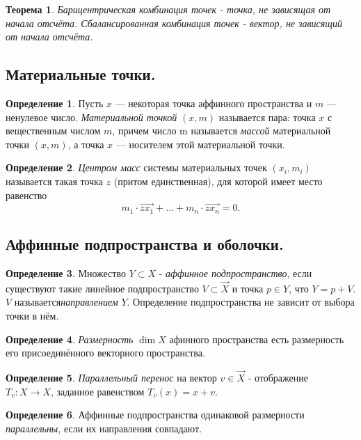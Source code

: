 \documentclass[a4paper,100pt]{article}
\theoremstyle{indented}
\newtheorem{theorem}{Теорема}
\theoremstyle{definition}
\newtheorem{defn}{Определение}
\theoremstyle{remark}
\DeclareMathOperator{\ra}{\rightarrow}
\begin{document}
\begin{theorem}
    Барицентрическая комбинация точек - точка, не зависящая от начала отсчёта. Сбалансированная комбинация точек - вектор, не зависящий от начала отсчёта.
\end{theorem}

\subsection{Материальные точки.}

\begin{defn}
    Пусть $x$ — некоторая точка аффинного пространства и $m$ — ненулевое число. \textit{Материальной точкой} $(x,m)$ называется пара: точка $x$ с вещественным числом $m$, причем число m называется \textit{массой} материальной точки $(x,m)$, а точка $x$ — носителем этой материальной точки.
\end{defn}

\begin{defn}
    \textit{Центром масс} системы материальных точек $(x_i, m_i)$ называется такая точка $z$ (притом единственная), для которой имеет место равенство
    \[
        m_1 \cdot \vec{zx_1} + \ldots + m_n \cdot \vec{zx_n} = 0. 
    \]
\end{defn}

\subsection{Аффинные подпространства и оболочки.}

\begin{defn}
    Множество $Y\subset X$ - \textit{аффинное подпространство}, если существуют такие линейное подпространство $V\subset \vec{X}$ и точка $p\in Y$, что $Y=p+V$. $V$ называется\textit{направлением} $Y$. Определение подпространства не зависит от выбора точки в нём.
\end{defn}

\begin{defn}
    \textit{Размерность} $\dim X$ афинного пространства есть размерность его присоединённого векторного пространства.
\end{defn}

\begin{defn}
    \textit{Параллельный перенос} на вектор $v\in \vec{X}$ - отображение $T_v:X\ra X$, заданное равенством $T_v(x)=x+v$. 
\end{defn}

\begin{defn}
    Аффинные подпространства одинаковой размерности \textit{параллельны}, если их направления совпадают.
\end{defn}
\end{document}

